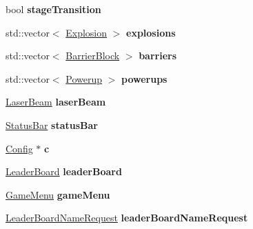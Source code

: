 \begin{DoxyCompactItemize}
\item 
\mbox{\label{classgame_1_1GameDialog_a898b490cecdc8c0638333e1d40174755}} 
bool {\bfseries stage\+Transition}
\item 
\mbox{\label{classgame_1_1GameDialog_a1f4332f40d03e76fcbb2b1a92d8577ed}} 
std\+::vector$<$ \hyperlink{classExplosion}{Explosion} $>$ {\bfseries explosions}
\item 
\mbox{\label{classgame_1_1GameDialog_a09bf5d984d42869d05e2d3cc7463779c}} 
std\+::vector$<$ \hyperlink{classgame_1_1BarrierBlock}{Barrier\+Block} $>$ {\bfseries barriers}
\item 
\mbox{\label{classgame_1_1GameDialog_ac0af6b65ee7430b3037f8e8df854a2a2}} 
std\+::vector$<$ \hyperlink{classgame_1_1Powerup}{Powerup} $>$ {\bfseries powerups}
\item 
\mbox{\label{classgame_1_1GameDialog_afba06639685f064a60e8a5dada570e8c}} 
\hyperlink{structgame_1_1LaserBeam}{Laser\+Beam} {\bfseries laser\+Beam}
\item 
\mbox{\label{classgame_1_1GameDialog_a3ca7bf0ecb861fa938fa3de7dc3acc7a}} 
\hyperlink{classgame_1_1StatusBar}{Status\+Bar} {\bfseries status\+Bar}
\item 
\mbox{\label{classgame_1_1GameDialog_a17d93b8febe2eec1522208ad92daba93}} 
\hyperlink{classgame_1_1Config}{Config} $\ast$ {\bfseries c}
\item 
\mbox{\label{classgame_1_1GameDialog_a2e4a03e762401ff2248aced6d02a3b9c}} 
\hyperlink{classgame_1_1LeaderBoard}{Leader\+Board} {\bfseries leader\+Board}
\item 
\mbox{\label{classgame_1_1GameDialog_a0db0d5e61c261d8cdf4335c5c5e4a7be}} 
\hyperlink{classgame_1_1GameMenu}{Game\+Menu} {\bfseries game\+Menu}
\item 
\mbox{\label{classgame_1_1GameDialog_a268c70040a5990c8aec70a2d93daa7d4}} 
\hyperlink{classLeaderBoardNameRequest}{Leader\+Board\+Name\+Request} {\bfseries leader\+Board\+Name\+Request}

\end{DoxyCompactItemize}
